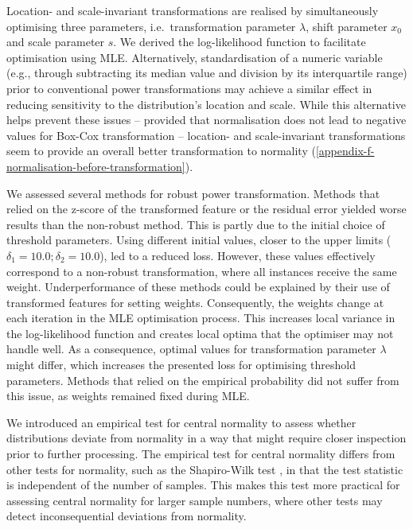 \documentclass[preprint,12pt,authoryear]{elsarticle}
\begin{document}
Location- and scale-invariant transformations are realised by
simultaneously optimising three parameters, i.e.~transformation
parameter \(\lambda\), shift parameter \(x_0\) and scale parameter
\(s\). We derived the log-likelihood function to facilitate optimisation
using MLE. Alternatively, standardisation of a numeric variable (e.g.,
through subtracting its median value and division by its interquartile
range) prior to conventional power transformations may achieve a similar
effect in reducing sensitivity to the distribution's location and scale.
While this alternative helps prevent these issues -- provided that
normalisation does not lead to negative values for Box-Cox
transformation -- location- and scale-invariant transformations seem to
provide an overall better transformation to normality 
(\ref{appendix-f-normalisation-before-transformation}).

We assessed several methods for robust power transformation. Methods
that relied on the z-score of the transformed feature or the residual
error yielded worse results than the non-robust method. This is partly
due to the initial choice of threshold parameters. Using different
initial values, closer to the upper limits
(\(\delta_1 = 10.0; \delta_2 = 10.0\)), led to a reduced loss. However,
these values effectively correspond to a non-robust transformation,
where all instances receive the same weight. Underperformance of these
methods could be explained by their use of transformed features for
setting weights. Consequently, the weights change at each iteration in
the MLE optimisation process. This increases local variance in the
log-likelihood function and creates local optima that the optimiser may
not handle well. As a consequence, optimal values for transformation
parameter \(\lambda\) might differ, which increases the presented loss
for optimising threshold parameters. Methods that relied on the
empirical probability did not suffer from this issue, as weights
remained fixed during MLE.

We introduced an empirical test for central normality to assess whether
distributions deviate from normality in a way that might require closer
inspection prior to further processing. The empirical test for central
normality differs from other tests for normality, such as the
Shapiro-Wilk test \citep{Shapiro1965-zd}, in that the test statistic is
independent of the number of samples. This makes this test more
practical for assessing central normality for larger sample numbers,
where other tests may detect inconsequential deviations from normality.
\end{document}
